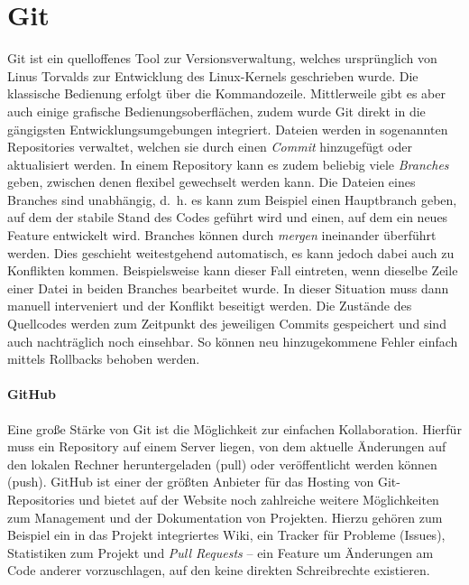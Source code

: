 \section{Git}
Git ist ein quelloffenes Tool zur Versionsverwaltung, welches ursprünglich von Linus Torvalds zur Entwicklung des Linux-Kernels geschrieben wurde.
Die klassische Bedienung erfolgt über die Kommandozeile.
Mittlerweile gibt es aber auch einige grafische Bedienungsoberflächen, zudem wurde Git direkt in die gängigsten Entwicklungsumgebungen integriert.
Dateien werden in sogenannten Repositories verwaltet, welchen sie durch einen \emph{Commit} hinzugefügt oder aktualisiert werden.
In einem Repository kann es zudem beliebig viele \emph{Branches} geben, zwischen denen flexibel gewechselt werden kann.
Die Dateien eines Branches sind unabhängig, d. h. es kann zum Beispiel einen Hauptbranch geben, auf dem der stabile Stand des Codes geführt wird und einen, auf dem ein neues Feature entwickelt wird.
Branches können durch \emph{mergen} ineinander überführt werden.
Dies geschieht weitestgehend automatisch, es kann jedoch dabei auch zu Konflikten kommen.
Beispielsweise kann dieser Fall eintreten, wenn dieselbe Zeile einer Datei in beiden Branches bearbeitet wurde.
In dieser Situation muss dann manuell interveniert und der Konflikt beseitigt werden.
Die Zustände des Quellcodes werden zum Zeitpunkt des jeweiligen Commits gespeichert und sind auch nachträglich noch einsehbar.
So können neu hinzugekommene Fehler einfach mittels Rollbacks behoben werden.

\paragraph{GitHub}
Eine große Stärke von Git ist die Möglichkeit zur einfachen Kollaboration.
Hierfür muss ein Repository auf einem Server liegen, von dem aktuelle Änderungen auf den lokalen Rechner heruntergeladen (pull) oder veröffentlicht werden können (push).
GitHub ist einer der größten Anbieter für das Hosting von Git-Repositories und bietet auf der Website noch zahlreiche weitere Möglichkeiten zum Management und der Dokumentation von Projekten.
Hierzu gehören zum Beispiel ein in das Projekt integriertes Wiki, ein Tracker für Probleme (Issues), Statistiken zum Projekt und \emph{Pull Requests} -- ein Feature um Änderungen am Code anderer vorzuschlagen, auf den keine direkten Schreibrechte existieren.

